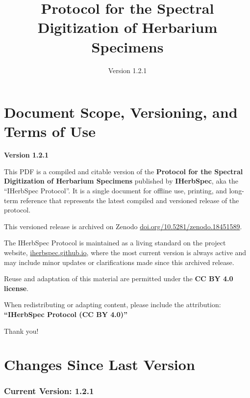 \documentclass[
  letterpaper,
  DIV=11,
  numbers=noendperiod]{scrreprt}
\title{Protocol for the Spectral Digitization of Herbarium Specimens}
\author{Version 1.2.1}
\date{}
\renewcommand*\contentsname{Table of contents}
\newcommand\contentsname{Table of contents}
\begin{document}
\maketitle

\renewcommand*\contentsname{Table of contents}
{
\hypersetup{linkcolor=}
\setcounter{tocdepth}{2}
\tableofcontents
}


\chapter{Document Scope, Versioning, and Terms of
Use}\label{document-scope-versioning-and-terms-of-use}

\textbf{Version 1.2.1}

This PDF is a compiled and citable version of the \textbf{Protocol for
the Spectral Digitization of Herbarium Specimens} published by
\textbf{IHerbSpec}, aka the ``IHerbSpec Protocol''. It is a single
document for offline use, printing, and long-term reference that
represents the latest compiled and versioned release of the protocol.

This versioned release is archived on Zenodo
\href{https://doi.org/10.5281/zenodo.18451589}{doi.org/10.5281/zenodo.18451589}.

The IHerbSpec Protocol is maintained as a living standard on the project
website,
\href{https://iherbspec.github.io/protocol.html}{iherbspec.github.io},
where the most current version is always active and may include minor
updates or clarifications made since this archived release.

Reuse and adaptation of this material are permitted under the \textbf{CC
BY 4.0 license}.

When redistributing or adapting content, please include the attribution:
\textbf{``IHerbSpec Protocol (CC BY 4.0)''}

Thank you!


\chapter{Changes Since Last Version}\label{changes-since-last-version}

\subsection{Current Version: 1.2.1}\label{current-version}
\end{document}
